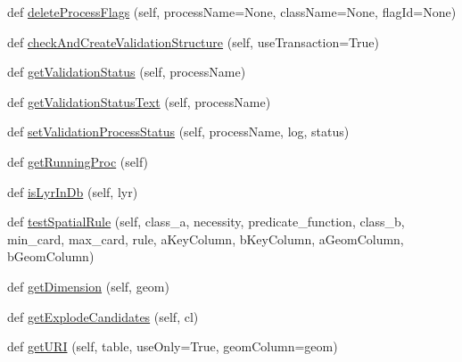 \begin{DoxyCompactItemize}
\item 
def \mbox{\hyperlink{class_dsg_tools_1_1_factories_1_1_db_factory_1_1postgis_db_1_1_postgis_db_a365a91237aedbc24dc4d263d6b572220}{delete\+Process\+Flags}} (self, process\+Name=None, class\+Name=None, flag\+Id=None)
\item 
def \mbox{\hyperlink{class_dsg_tools_1_1_factories_1_1_db_factory_1_1postgis_db_1_1_postgis_db_a8e1f9176191851a4f0433c1cb10b0c39}{check\+And\+Create\+Validation\+Structure}} (self, use\+Transaction=True)
\item 
def \mbox{\hyperlink{class_dsg_tools_1_1_factories_1_1_db_factory_1_1postgis_db_1_1_postgis_db_ae9935f758bccefcd0b740343ac2b16a8}{get\+Validation\+Status}} (self, process\+Name)
\item 
def \mbox{\hyperlink{class_dsg_tools_1_1_factories_1_1_db_factory_1_1postgis_db_1_1_postgis_db_a82dcb02ab6375562fa7b576df97ef964}{get\+Validation\+Status\+Text}} (self, process\+Name)
\item 
def \mbox{\hyperlink{class_dsg_tools_1_1_factories_1_1_db_factory_1_1postgis_db_1_1_postgis_db_afdd4d6d2db4d633abeea3d6c977c56b7}{set\+Validation\+Process\+Status}} (self, process\+Name, log, status)
\item 
def \mbox{\hyperlink{class_dsg_tools_1_1_factories_1_1_db_factory_1_1postgis_db_1_1_postgis_db_add84568ef5bdb462f01ceee72a8c9aed}{get\+Running\+Proc}} (self)
\item 
def \mbox{\hyperlink{class_dsg_tools_1_1_factories_1_1_db_factory_1_1postgis_db_1_1_postgis_db_adfac88deab557f43b09cf41773d5c587}{is\+Lyr\+In\+Db}} (self, lyr)
\item 
def \mbox{\hyperlink{class_dsg_tools_1_1_factories_1_1_db_factory_1_1postgis_db_1_1_postgis_db_abeada3e87837c4fc934994476ff189fb}{test\+Spatial\+Rule}} (self, class\+\_\+a, necessity, predicate\+\_\+function, class\+\_\+b, min\+\_\+card, max\+\_\+card, rule, a\+Key\+Column, b\+Key\+Column, a\+Geom\+Column, b\+Geom\+Column)
\item 
def \mbox{\hyperlink{class_dsg_tools_1_1_factories_1_1_db_factory_1_1postgis_db_1_1_postgis_db_a22c4806047ef96cae9dedc2966196272}{get\+Dimension}} (self, geom)
\item 
def \mbox{\hyperlink{class_dsg_tools_1_1_factories_1_1_db_factory_1_1postgis_db_1_1_postgis_db_a73af37a3d5f70ddac857d96693bb789b}{get\+Explode\+Candidates}} (self, cl)
\item 
def \mbox{\hyperlink{class_dsg_tools_1_1_factories_1_1_db_factory_1_1postgis_db_1_1_postgis_db_ac63b43fecaed6ce997f17389c520174c}{get\+U\+RI}} (self, table, use\+Only=True, geom\+Column=\textquotesingle{}geom\textquotesingle{})

\end{DoxyCompactItemize}
